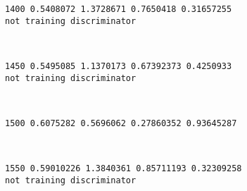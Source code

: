\documentclass[11pt]{article}
\begin{document}
    \begin{Verbatim}[commandchars=\\\{\}]
1400 0.5408072 1.3728671 0.7650418 0.31657255
not training discriminator

    \end{Verbatim}

    \begin{center}
    \end{center}
    { \hspace*{\fill} \\}
    
    \begin{Verbatim}[commandchars=\\\{\}]
1450 0.5495085 1.1370173 0.67392373 0.4250933
not training discriminator

    \end{Verbatim}

    \begin{center}
    \end{center}
    { \hspace*{\fill} \\}
    
    \begin{Verbatim}[commandchars=\\\{\}]
1500 0.6075282 0.5696062 0.27860352 0.93645287

    \end{Verbatim}

    \begin{center}
    \end{center}
    { \hspace*{\fill} \\}
    
    \begin{Verbatim}[commandchars=\\\{\}]
1550 0.59010226 1.3840361 0.85711193 0.32309258
not training discriminator

    \end{Verbatim}

    \begin{center}
    \end{center}
    { \hspace*{\fill} \\}
    
\end{document}
